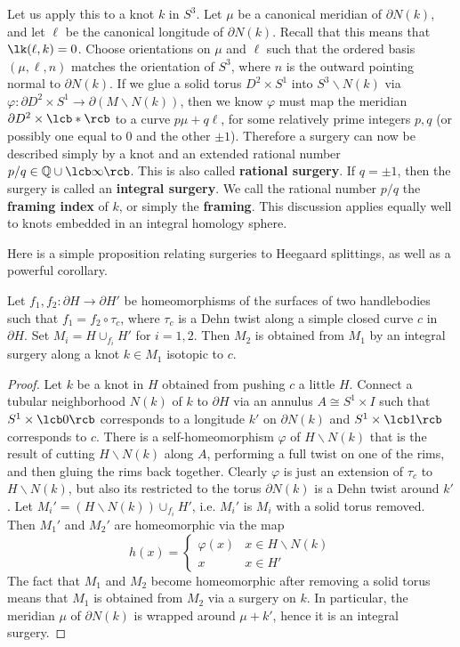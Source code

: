 Let us apply this to a knot $k$ in $S^3$. Let $\mu$ be a canonical meridian of $\partial N(k)$, and let $\ell$ be the canonical longitude of $\partial N(k)$. Recall that this means that $\lk(\ell,k)=0$. Choose orientations on $\mu$ and $\ell$ such that the ordered basis $(\mu,\ell,n)$ matches the orientation of $S^3$, where $n$ is the outward pointing normal to $\partial N(k)$. If we glue a solid torus $D^2 \times S^1$ into $S^3 \backslash N(k)$ via $\varphi : \partial D^2 \times S^1 \rightarrow \partial(M \backslash N(k))$, then we know $\varphi$ must map the meridian $\partial D^2 \times \lcb * \rcb$ to a curve $p\mu + q\ell$, for some relatively prime integers $p,q$ (or possibly one equal to 0 and the other $\pm 1$). Therefore a surgery can now be described simply by a knot and an extended rational number $p/q \in \mathbb Q \cup \lcb \infty \rcb$. This is also called \textbf{rational surgery}. If $q = \pm 1$, then the surgery is called an \textbf{integral surgery}. We call the rational number $p/q$ the \textbf{framing index} of $k$, or simply the \textbf{framing}. This discussion applies equally well to knots embedded in an integral homology sphere. 

Here is a simple proposition relating surgeries to Heegaard splittings, as well as a powerful corollary.

\begin{prop}
\label{Heegaard splitting and surgery relationship}
Let $f_1,f_2 : \partial H \rightarrow \partial H'$ be homeomorphisms of the surfaces of two handlebodies such that $f_1 = f_2 \circ \tau_c$, where $\tau_c$ is a Dehn twist along a simple closed curve $c$ in $\partial H$. Set $M_i = H \cup_{f_i} H'$ for $i=1,2$. Then $M_2$ is obtained from $M_1$ by an integral surgery along a knot $k \in M_1$ isotopic to $c$. 
\end{prop}
\begin{proof}
Let $k$ be a knot in $H$ obtained from pushing $c$ a little $H$. Connect a tubular neighborhood $N(k)$ of $k$ to $\partial H$ via an annulus $A \cong S^1 \times I$ such that $S^1 \times \lcb 0 \rcb$ corresponds to a longitude $k'$ on $\partial N(k)$ and $S^1 \times \lcb 1 \rcb$ corresponds to $c$. There is a self-homeomorphism $\varphi$ of $H \backslash N(k)$ that is the result of cutting $H \backslash N(k)$ along $A$, performing a full twist on one of the rims, and then gluing the rims back together. Clearly $\varphi$ is just an extension of $\tau_c$ to $H \backslash N(k)$, but also its restricted to the torus $\partial N(k)$ is a Dehn twist around $k'$. Let $M_i' = (H \backslash N(k)) \cup_{f_i} H'$, i.e. $M_i'$ is $M_i$ with a solid torus removed. Then $M_1'$ and $M_2'$ are homeomorphic via the map
\[ h(x) = \begin{cases} \varphi(x) & x \in H \backslash N(k) \\ x & x \in H' \end{cases} \]
The fact that $M_1$ and $M_2$ become homeomorphic after removing a solid torus means that $M_1$ is obtained from $M_2$ via a surgery on $k$. In particular, the meridian $\mu$ of $\partial N(k)$ is wrapped around $\mu+k'$, hence it is an integral surgery.
\end{proof}

